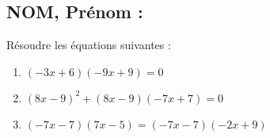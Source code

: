 \documentclass[a4paper,11pt,exos]{nsi}
\begin{document}
\subsection*{NOM, Prénom : \dotfill} 


\maketitle



\begin{exercice}
Résoudre les équations suivantes :

	\begin{enumerate}
		\item $(-3x+6)(-9x+9)=0$
        \item $(8x-9)^{2}+(8x-9)(-7x+7)=0$ 
	    \item $(-7x-7)(7x-5)=(-7x-7)(-2x+9)$
	\end{enumerate}


\end{exercice}

\end{document}

